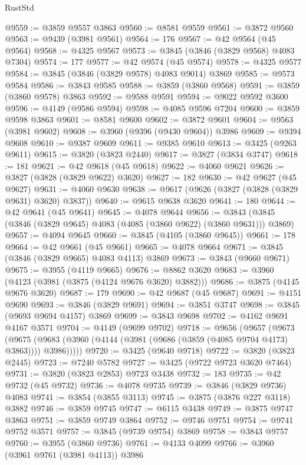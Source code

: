 \begin{lexlean}{RustStd}
\begin{coremodule}
@9559 := @3859 @9557 @3863
@9560 := @8581 @9559
@9561 := @3872 @9560
@9563 := @9439 (@3981 @9561)
@9564 := 176
@9567 := @42 @9564 (@45 @9564)
@9568 := @4325 @9567
@9573 := @3845 (@3846 (@3829 @9568) @4083 @7304)
@9574 := 177
@9577 := @42 @9574 (@45 @9574)
@9578 := @4325 @9577
@9584 := @3845 (@3846 (@3829 @9578) @4083 @9014) @3869
@9585 := @9573 @9584
@9586 := @3843 @9585
@9588 := @3859 (@3860 @9568)
@9591 := @3859 (@3860 @9578) @3863
@9592 := @9588 @9591
@9594 := @9022 @9592 @3600
@9596 := @4149 (@9586 @9594)
@9598 := @4085 @9596 @7204
@9600 := @3859 @9598 @3863
@9601 := @8581 @9600
@9602 := @3872 @9601
@9604 := @9563 (@3981 @9602)
@9608 := @3960 (@9396 (@9430 @9604)) @3986
@9609 := @9394 @9608
@9610 := @9387 @9609
@9611 := @9385 @9610
@9613 := @3425 (@9263 @9611)
@9615 := @3820 (@3823 @2440)
@9617 := @3827 (@3834 @3747)
@9618 := 181
@9621 := @42 @9618 (@45 @9618)
@9622 := @4060 @9621
@9626 := @3827 (@3828 (@3829 @9622) @3620)
@9627 := 182
@9630 := @42 @9627 (@45 @9627)
@9631 := @4060 @9630
@9638 := @9617 (@9626 (@3827 (@3828 (@3829 @9631) @3620) @3837))
@9640 := @9615 @9638 @3620
@9641 := 180
@9644 := @42 @9641 (@45 @9641)
@9645 := @4078 @9644
@9656 := @3843 (@3845 (@3846 (@3829 @9645) @4083 (@4085 (@3860 @9622) (@3860 @9631))) @3869)
@9657 := @4094 @9645
@9660 := @3845 (@4105 (@3860 @9645))
@9661 := 178
@9664 := @42 @9661 (@45 @9661)
@9665 := @4078 @9664
@9671 := @3845 (@3846 (@3829 @9665) @4083 @4113) @3869
@9673 := @3843 (@9660 @9671)
@9675 := @3955 (@4119 @9665)
@9676 := @8862 @3620
@9683 := @3960 (@4123 (@3981 (@3875 (@4124 @9676 @3620) @3882)))
@9686 := @3875 (@4145 @9676 @3620)
@9687 := 179
@9690 := @42 @9687 (@45 @9687)
@9691 := @4151 @9690
@9693 := @3846 (@3829 @9691)
@9694 := @3851 @3747
@9698 := @3845 (@9693 @9694 @4157) @3869
@9699 := @3843 @9698
@9702 := @4162 @9691 @4167 @3571
@9704 := @4149 (@9699 @9702)
@9718 := @9656
    (@9657
      (@9673
        (@9675 (@9683 (@3960 (@4144 (@3981 (@9686 (@3859 (@4085 @9704 @4173) @3863)))) @3986)))))
@9720 := @3425 (@9640 @9718)
@9722 := @3820 (@3823 @2445)
@9723 := @7240 @5782
@9727 := @3425 (@9722 @9723 @3620 @7464)
@9731 := @3820 (@3823 @2853) @9723 @3438
@9732 := 183
@9735 := @42 @9732 (@45 @9732)
@9736 := @4078 @9735
@9739 := @3846 (@3829 @9736) @4083
@9741 := @3854 (@3855 @3113)
@9745 := @3875 (@3876 @227 @3118) @3882
@9746 := @3859 @9745
@9747 := @6115 @3438
@9749 := @3875 @9747 @3863
@9751 := @3859 @9749 @3864
@9752 := @9746 @9751
@9754 := @9741 @9752 @3571
@9757 := @3845 (@9739 @9754) @3869
@9758 := @3843 @9757
@9760 := @3955 (@3860 @9736)
@9761 := @4133 @4099
@9766 := @3960 (@3961 @9761 (@3981 @4113)) @3986

\end{coremodule}
\end{lexlean}
